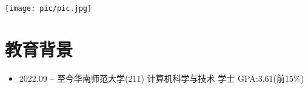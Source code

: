 \documentclass{resume}
\begin{document}

\begin{minipage}{0.8\textwidth}
\end{minipage}
\begin{minipage}{0.2\textwidth}
\centering
\vspace{-0.4in} %
\texttt{[image: pic/pic.jpg]}
\end{minipage}

\section{教育背景}
\begin{normalsize}
  \begin{itemize}[parsep=0.5ex]
    \item {2022.09 -- 至今}\hspace{0.8cm}华南师范大学(211)  \hspace{0.8cm} 计算机科学与技术 \hspace{0.8cm} 学士 \hspace{0.8cm} GPA:3.61(前15\%)
  \end{itemize}
\end{normalsize}
\end{document}
